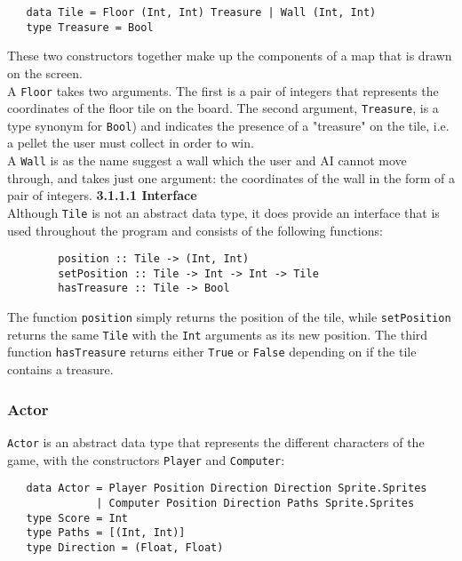 \documentclass{article}
\begin{document}
   \begin{verbatim}
   data Tile = Floor (Int, Int) Treasure | Wall (Int, Int)
   type Treasure = Bool
   \end{verbatim}

        \noindent These two constructors together make up the components of a map that is drawn on the screen. \\
		\newline
		A \texttt{Floor} takes two arguments. The first is a pair of integers that represents the coordinates of the floor tile on the board. The second argument, \texttt{Treasure}, is a type synonym for \texttt{Bool}) and indicates the presence of a "treasure" on the tile, i.e. a pellet the user must collect in order to win.\\
		\newline
		A \texttt{Wall} is as the name suggest a wall which the user and AI cannot move through, and takes just one argument: the coordinates of the wall in the form of a pair of integers.
    	\newline
    	\textbf{3.1.1.1 Interface} \\
    	\newline
		Although \texttt{Tile} is not an abstract data type, it does provide an interface that is used throughout the program and consists of the following functions:\\

   		\begin{verbatim}
   		position :: Tile -> (Int, Int)
   		setPosition :: Tile -> Int -> Int -> Tile
   		hasTreasure :: Tile -> Bool
   		\end{verbatim}

    	\noindent The function \texttt{position} simply returns the position of the tile, while \texttt{setPosition} returns the same \texttt{Tile} with the \texttt{Int} arguments as its new position. The third function \texttt{hasTreasure} returns either \texttt{True} or \texttt{False} depending on if the tile contains a treasure.

        \subsubsection{Actor}
    	\texttt{Actor} is an abstract data type that represents the different characters of the game, with the constructors \texttt{Player} and \texttt{Computer}:

   \begin{verbatim}
   data Actor = Player Position Direction Direction Sprite.Sprites
              | Computer Position Direction Paths Sprite.Sprites
   type Score = Int
   type Paths = [(Int, Int)]
   type Direction = (Float, Float)
   \end{verbatim}
\end{document}
